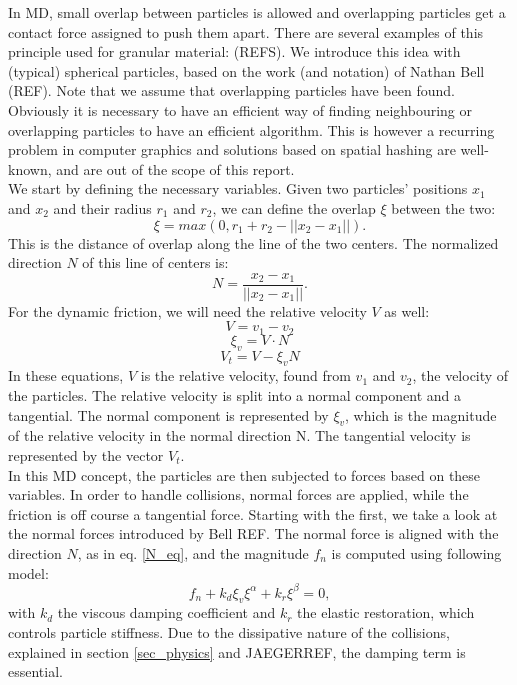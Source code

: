 In MD, small overlap between particles is allowed and overlapping particles get a contact force assigned to push them apart. There are several examples of this principle used for granular material: (REFS). We introduce this idea with (typical) spherical particles, based on the work (and notation) of Nathan Bell (REF). Note that we assume that overlapping particles have been found. Obviously it is necessary to have an efficient way of finding neighbouring or overlapping particles to have an efficient algorithm. This is however a recurring problem in computer graphics and solutions based on spatial hashing are well-known, and are out of the scope of this report.\\

We start by defining the necessary variables. Given two particles' positions $x_1$ and $x_2$ and their radius $r_1$ and $r_2$, we can define the overlap $\xi$ between the two:\\
\begin{equation}
\xi = max(0, r_1 + r_2 - || x_2 - x_1||).
\end{equation}
This is the distance of overlap along the line of the two centers. The normalized direction $N$ of this line of centers is:
\begin{equation}\label{N_eq}
N = \frac{x_2 - x_1}{||x_2 - x_1||}.
\end{equation}
For the dynamic friction, we will need the relative velocity $V$ as well:
\begin{equation}
V = v_1 - v_2
\end{equation}
\begin{equation}
\xi_v = V \cdot N
\end{equation}
\begin{equation}
V_t = V -  \xi_v N
\end{equation}
In these equations, $V$ is the relative velocity, found from $v_1$ and $v_2$, the velocity of the particles. The relative velocity is split into a normal component and a tangential. The normal component is represented by $\xi_v$, which is the magnitude of the relative velocity in the normal direction N. The tangential velocity is represented by the vector $V_t$.\\

In this MD concept, the particles are then subjected to forces based on these variables. In order to handle collisions, normal forces are applied, while the friction is off course a tangential force. Starting with the first, we take a look at the normal forces introduced by Bell REF. The normal force is aligned with the direction $N$, as in eq. \eqref{N_eq}, and the magnitude $f_n$ is computed using following model:
\begin{equation} \label{eq_normalf}
f_n + k_d \xi_v \xi^{\alpha} + k_r \xi^{\beta}  = 0,
\end{equation} 
with $k_d$ the viscous damping coefficient and $k_r$ the elastic restoration, which controls particle stiffness. Due to the dissipative nature of the collisions, explained in section \ref{sec_physics} and JAEGERREF, the damping term is essential.\\

